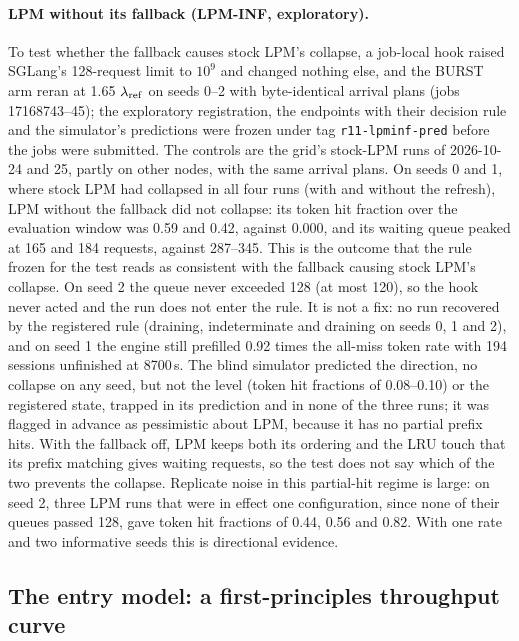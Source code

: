 \paragraph{LPM without its fallback (LPM-INF, exploratory).} To test whether the fallback causes stock LPM's collapse, a job-local hook raised SGLang's 128-request limit to $10^9$ and changed nothing else, and the BURST arm reran at 1.65 $\lambda_{\mathrm{ref}}$ on seeds 0--2 with byte-identical arrival plans (jobs 17168743--45); the exploratory registration, the endpoints with their decision rule and the simulator's predictions were frozen under tag \texttt{r11-lpminf-pred} before the jobs were submitted. The controls are the grid's stock-LPM runs of 2026-10-24 and 25, partly on other nodes, with the same arrival plans. On seeds 0 and 1, where stock LPM had collapsed in all four runs (with and without the refresh), LPM without the fallback did not collapse: its token hit fraction over the evaluation window was 0.59 and 0.42, against 0.000, and its waiting queue peaked at 165 and 184 requests, against 287--345. This is the outcome that the rule frozen for the test reads as consistent with the fallback causing stock LPM's collapse. On seed 2 the queue never exceeded 128 (at most 120), so the hook never acted and the run does not enter the rule. It is not a fix: no run recovered by the registered rule (draining, indeterminate and draining on seeds 0, 1 and 2), and on seed 1 the engine still prefilled 0.92 times the all-miss token rate with 194 sessions unfinished at 8700\,s. The blind simulator predicted the direction, no collapse on any seed, but not the level (token hit fractions of 0.08--0.10) or the registered state, trapped in its prediction and in none of the three runs; it was flagged in advance as pessimistic about LPM, because it has no partial prefix hits. With the fallback off, LPM keeps both its ordering and the LRU touch that its prefix matching gives waiting requests, so the test does not say which of the two prevents the collapse. Replicate noise in this partial-hit regime is large: on seed 2, three LPM runs that were in effect one configuration, since none of their queues passed 128, gave token hit fractions of 0.44, 0.56 and 0.82. With one rate and two informative seeds this is directional evidence.

\subsection{The entry model: a first-principles throughput curve}\label{app:entry}

